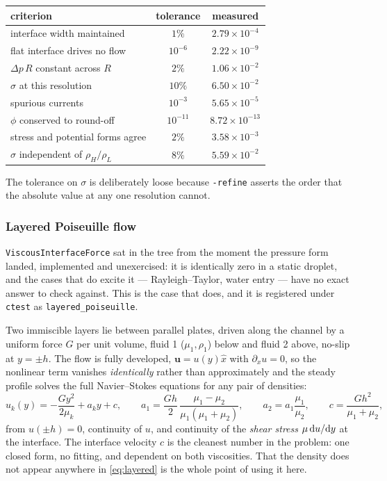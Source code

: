\documentclass[11pt,a4paper]{article}
\newcommand{\code}[1]{\texttt{\small #1}}
\newcommand{\uu}{\bm{u}}
\newcommand{\e}[1]{\times 10^{#1}}
\begin{document}
\begin{center}\small
\begin{tabular}{lcc}
\toprule
criterion & tolerance & measured \\
\midrule
interface width maintained              & $1\%$      & $2.79\e{-4}$ \\
flat interface drives no flow           & $10^{-6}$  & $2.22\e{-9}$ \\
$\Delta p\,R$ constant across $R$       & $2\%$      & $1.06\e{-2}$ \\
$\sigma$ at this resolution             & $10\%$     & $6.50\e{-2}$ \\
spurious currents                       & $10^{-3}$  & $5.65\e{-5}$ \\
$\phi$ conserved to round-off           & $10^{-11}$ & $8.72\e{-13}$ \\
stress and potential forms agree        & $2\%$      & $3.58\e{-3}$ \\
$\sigma$ independent of $\rho_H/\rho_L$ & $8\%$      & $5.59\e{-2}$ \\
\bottomrule
\end{tabular}
\end{center}

\noindent The tolerance on $\sigma$ is deliberately loose because
\code{-refine} asserts the order that the absolute value at any one resolution
cannot.
\subsubsection{Layered Poiseuille flow}
\label{sec:layered}

\code{ViscousInterfaceForce} sat in the tree from the moment the pressure form
landed, implemented and unexercised: it is identically zero in a static droplet,
and the cases that do excite it --- Rayleigh--Taylor, water entry --- have no
exact answer to check against. This is the case that does, and it is registered
under \code{ctest} as \code{layered\_poiseuille}.

Two immiscible layers lie between parallel plates, driven along the channel by a
uniform force $G$ per unit volume, fluid 1 ($\mu_1,\rho_1$) below and fluid 2
above, no-slip at $y=\pm h$. The flow is fully developed, $\uu = u(y)\hat{x}$ with
$\partial_x u = 0$, so the nonlinear term vanishes \emph{identically} rather than
approximately and the steady profile solves the full Navier--Stokes equations for
any pair of densities:
\begin{equation}
  u_k(y) = -\frac{G y^2}{2\mu_k} + a_k y + c, \qquad
  a_1 = \frac{Gh}{2}\,\frac{\mu_1-\mu_2}{\mu_1(\mu_1+\mu_2)}, \qquad
  a_2 = a_1\frac{\mu_1}{\mu_2}, \qquad
  c = \frac{Gh^2}{\mu_1+\mu_2},
  \label{eq:layered}
\end{equation}
from $u(\pm h)=0$, continuity of $u$, and continuity of the \emph{shear stress}
$\mu\,{\rm d}u/{\rm d}y$ at the interface. The interface velocity $c$ is the
cleanest number in the problem: one closed form, no fitting, and dependent on
both viscosities. That the density does not appear anywhere in
\eqref{eq:layered} is the whole point of using it here.
\end{document}
